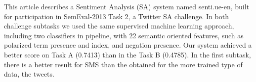 This article describes a  Sentiment Analysis (SA) system named senti.ue-en, built for participation in SemEval-2013 Task 2, a Twitter SA challenge. 
 In both challenge subtasks we used the same supervised machine learning
 approach,
  including two classifiers in pipeline, with 22 semantic oriented features,
 such as polarized term presence and index, and negation presence.
 Our system achieved a better score on Task A (0.7413) than in the Task B
 (0.4785). In the first subtask, there is a better result for  SMS
  than the obtained for the more trained type of data, the tweets.

